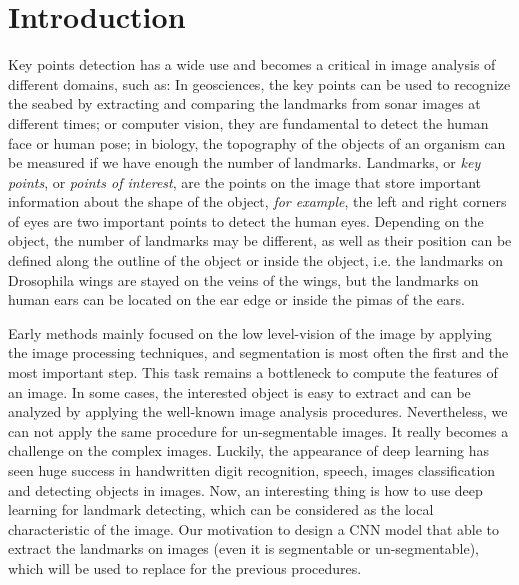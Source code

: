 \documentclass[review]{elsarticle}
\begin{document}
\linenumbers

\section{Introduction}
\label{sIntroduction}
Key points detection has a wide use and becomes a critical in image analysis of different domains, such as: In geosciences, the key points can be used to recognize the seabed by extracting and comparing the landmarks from sonar images at different times; or computer vision, they are fundamental to detect the human face or human pose; in biology, the topography of the objects of an organism can be measured if we have enough the number of landmarks. Landmarks, or \textit{key points}, or \textit{points of interest}, are the points on the image that store important information about the shape of the object, \textit{for example}, the left and right corners of eyes are two important points to detect the human eyes. Depending on the object, the number of landmarks may  be different, as well as their position can be defined along the outline of the object or inside the object, i.e. the landmarks on Drosophila wings \cite{drosophilaWings} are stayed on the veins of the wings, but the landmarks on human ears \cite{cintas2016automatic} can be located on the ear edge or inside the pimas of the ears.

Early methods \cite{lowe2004distinctive,bay2006surf,palaniswamy2010automatic} mainly focused on the low level-vision of the image by applying the image processing techniques, and segmentation is most often the first and the most important step. This task remains a bottleneck to compute the features of an image. In some cases, the interested object is easy to extract and can be analyzed by applying the well-known image analysis procedures. Nevertheless, we can not apply the same procedure for un-segmentable images. It really becomes a challenge on the complex images. Luckily, the appearance of deep learning has seen huge success in handwritten digit recognition, speech, images classification and detecting objects in images. Now, an interesting thing is how to use deep learning for landmark detecting, which can be considered as the local characteristic of the image. Our motivation to design a CNN model that able to extract the landmarks on images (even it is segmentable or un-segmentable), which will be used to replace for the previous procedures.
\end{document}

